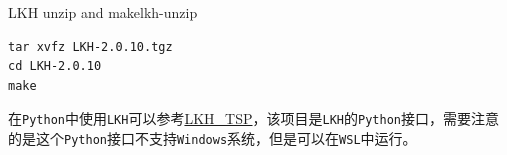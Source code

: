 \begin{code}{LKH unzip and make}{lkh-unzip}
\begin{verbatim}
tar xvfz LKH-2.0.10.tgz
cd LKH-2.0.10
make
\end{verbatim}
\end{code}

在\texttt{Python}中使用\texttt{LKH}可以参考\href{https://github.com/ntnu-arl/LKH_TSP}{LKH\_TSP}，该项目是\texttt{LKH}的\texttt{Python}接口，需要注意的是这个\texttt{Python}接口不支持\texttt{Windows}系统，但是可以在\texttt{WSL}中运行。
